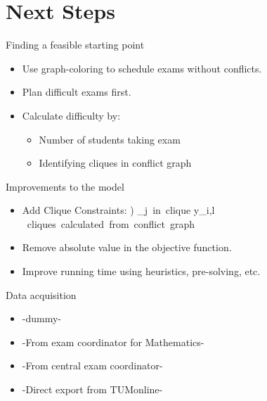 \documentclass[12pt,t]{beamer}
\def\ba#1\ea{\begin{align*}#1\end{align*}}
\begin{document}
\section{Next Steps}

\begin{frame}{Finding a feasible starting point}
    \begin{itemize}
        \item Use graph-coloring to schedule exams without conflicts.
        \item Plan difficult exams first.
        \item Calculate difficulty by:
        \begin{itemize}
        	\item Number of students taking exam
        	\item Identifying cliques in conflict graph	
        \end{itemize}
    \end{itemize}
\end{frame}

\begin{frame}{Improvements to the model}
	\begin{itemize}
	    \item Add Clique Constraints:
	    \ba
	    (7) \;\;\;\; \sum_{\mbox{\small{j in clique}}} y_{i,l}  \;\;\;\forall \mbox{\small{ cliques calculated from conflict graph}}
	    \ea
	    \pause
	    \item Remove absolute value in the objective function.
	    \pause
	    \item Improve running time using heuristics, pre-solving, etc.	    
    \end{itemize}
\end{frame}

\begin{frame}{Data acquisition}
	\begin{itemize}
		\item -dummy-
	    \item -From exam coordinator for Mathematics-
	    \item -From central exam coordinator-
	    \item -Direct export from TUMonline-   
    \end{itemize}
\end{frame}
     
\end{document}

